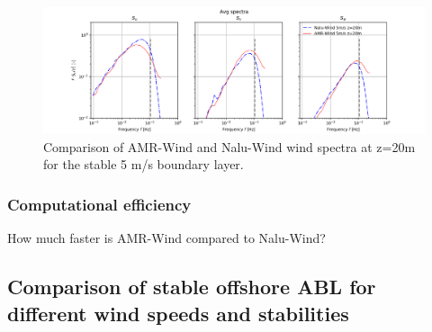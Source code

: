 \begin{figure} %
  \centering
  \includegraphics[width=7.0in]{figures/Compare_AMRWind_NaluWind/AMRWind_NaluWind_Spectra_Stable_z20.png}

  \caption{\label{fig:CompareAMRvsNaluSpectra} Comparison of AMR-Wind
    and Nalu-Wind wind spectra at z=20m for the stable 5 m/s boundary
    layer. }
\end{figure}




\subsubsection{Computational efficiency}
How much faster is AMR-Wind compared to Nalu-Wind?  \\

\subsection{Comparison of stable offshore ABL for different wind speeds and stabilities}

